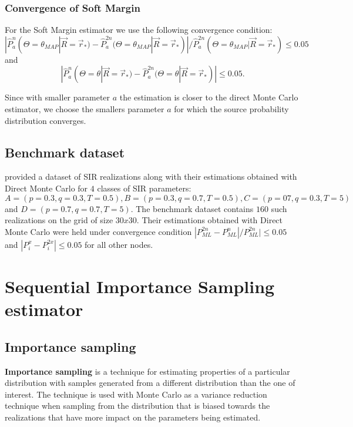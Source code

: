 \documentclass[times, utf8, diplomski]{fer}
\begin{document}
\subsection{Convergence of Soft Margin}
For the Soft Margin estimator we use the following convergence condition: 
\begin{equation*}
|\hat{P}_a^{n}(\Theta = \theta_{MAP} | \vec{R} = \vec{r}_*) - \hat{P}_a^{2n}(\Theta = \theta_{MAP} | \vec{R} = \vec{r}_*)| / \hat{P}_a^{2n}(\Theta = \theta_{MAP} | \vec{R} = \vec{r}_*) \leq 0.05 
\end{equation*}
and
\begin{equation*}
|\hat{P}_a^{n}(\Theta = \theta | \vec{R} = \vec{r}_*) - \hat{P}_a^{2n}(\Theta = \theta | \vec{R} = \vec{r}_*)| \leq 0.05.
\end{equation*}

Since with smaller parameter $a$ the estimation is closer to the direct Monte Carlo estimator, we choose the  smallers parameter $a$ for which the source probability distribution converges. 
\section{Benchmark dataset}
\cite{Nino} provided a dataset of SIR realizations along with their estimations obtained with Direct Monte Carlo for $4$ classes of SIR parameters: $A = (p = 0.3, q = 0.3, T =0 .5), B = (p = 0.3, q = 0.7, T = 0.5), C = (p = 07, q = 0.3, T = 5)$ and  $D = (p = 0.7, q = 0.7, T = 5)$. The benchmark dataset contains $160$ such realizations on the grid of size $30x30$.
 Their estimations obtained with Direct Monte Carlo were held under convergence condition $|P_{ML}^{2n} - P_{ML}^{n}| / P_{ML}^{2n}| \leq 0.05$  and $|P_i^x - P_i^{2x}| \leq 0.05$ for all other nodes.
 


\chapter{Sequential Importance Sampling estimator}
\section{Importance sampling}

\textbf{Importance sampling} is a technique for estimating properties of a particular distribution with samples generated from a different distribution than the one of interest. The technique is used with Monte Carlo as a variance reduction technique when sampling from the distribution that is biased towards the realizations that have more impact on the parameters being estimated.
\end{document}
